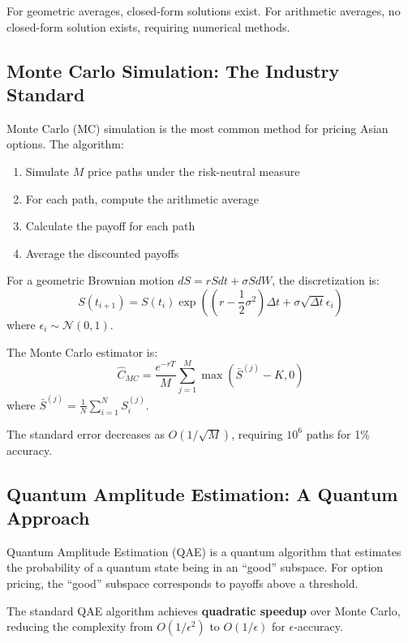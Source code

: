 \documentclass[12pt]{article}
\begin{document}
For geometric averages, closed-form solutions exist. For arithmetic averages, no closed-form solution exists, requiring numerical methods.

\subsection{Monte Carlo Simulation: The Industry Standard}

Monte Carlo (MC) simulation is the most common method for pricing Asian options. The algorithm:

\begin{enumerate}
    \item Simulate $M$ price paths under the risk-neutral measure
    \item For each path, compute the arithmetic average
    \item Calculate the payoff for each path
    \item Average the discounted payoffs
\end{enumerate}

For a geometric Brownian motion $dS = rSdt + \sigma S dW$, the discretization is:
\begin{equation}
    S(t_{i+1}) = S(t_i) \exp\left(\left(r - \frac{1}{2}\sigma^2\right)\Delta t + \sigma \sqrt{\Delta t} \epsilon_i\right)
\end{equation}
where $\epsilon_i \sim \mathcal{N}(0,1)$.

The Monte Carlo estimator is:
\begin{equation}
    \hat{C}_{MC} = \frac{e^{-rT}}{M} \sum_{j=1}^{M} \max\left(\bar{S}^{(j)} - K, 0\right)
\end{equation}
where $\bar{S}^{(j)} = \frac{1}{N} \sum_{i=1}^{N} S_i^{(j)}$.

The standard error decreases as $O(1/\sqrt{M})$, requiring $10^6$ paths for 1\% accuracy.

\subsection{Quantum Amplitude Estimation: A Quantum Approach}

Quantum Amplitude Estimation (QAE) is a quantum algorithm that estimates the probability of a quantum state being in an ``good'' subspace. For option pricing, the ``good'' subspace corresponds to payoffs above a threshold.

The standard QAE algorithm achieves \textbf{quadratic speedup} over Monte Carlo, reducing the complexity from $O(1/\epsilon^2)$ to $O(1/\epsilon)$ for $\epsilon$-accuracy.
\end{document}
